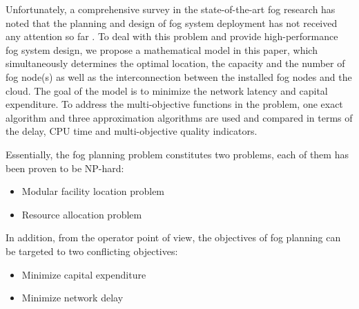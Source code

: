 \documentclass[10pt,journal,compsoc]{IEEEtran}
\begin{document}
Unfortunately, a comprehensive survey in the state-of-the-art fog research has noted that the planning and design of fog system deployment has not received any attention so far \cite{mouradian2017comprehensive}. To deal with this problem and provide high-performance fog system design, we propose a mathematical model in this paper, which simultaneously determines the optimal location, the capacity and the number of fog node(s) as well as the interconnection between the installed fog nodes and the cloud. The goal of the model is to minimize the network latency and capital expenditure. To address the multi-objective functions in the problem, one exact algorithm and three approximation algorithms are used and compared in terms of the delay, CPU time and multi-objective quality indicators. 


Essentially, the fog planning problem constitutes two problems, each of them has been proven to be NP-hard:
\begin{itemize}
\item Modular facility location problem
\item Resource allocation problem
\end{itemize}
In addition, from the operator point of view, the objectives of fog planning can be targeted to two conflicting objectives:
\begin{itemize}
\item Minimize capital expenditure
\item Minimize network delay
\end{itemize}
\end{document}
